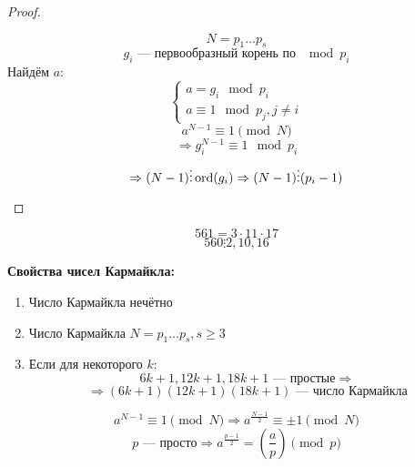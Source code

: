 \begin{proof}
\begin{itemize}
\begin{itemize}
\[                        N = p_1 \ldots p_s
                    \]
                    \[
                        g_i \text{ --- первообразный корень по $\mod p_i$}
                    \]
                    Найдём $a$:
                    \[
                    \begin{cases}
                    a = g_i \mod p_i \\
                    a \equiv 1 \mod p_j, j \neq i
                    \end{cases}
                    \]
                    \[
                    a^{N - 1} \equiv 1 \pmod N
                    \]
                    \[
                    \Rightarrow g_i ^{N - 1} \equiv 1 \mod p_i
                    \]
                    \[
                   \Rightarrow (N - 1) \vdots  \operatorname{ord}(g_i) \Rightarrow (N - 1) \vdots (p_i - 1)
                    \]
            \end{itemize}
    \end{itemize}
\end{proof}
\begin{example}
    \[
    561 = 3 \cdot 11 \cdot 17
    \]
    \[
    560 \vdots 2, 10, 16
    \]
\end{example}
\textbf{Свойства чисел Кармайкла:}
\begin{enumerate}
    \item Число Кармайкла нечётно
    \item Число Кармайкла $N = p_1 \ldots p_s, s \geq 3$
    \item Если для некоторого $k$:
        \[
        6k + 1, 12k + 1, 18k + 1 \text{ --- простые} \Rightarrow
        \]
        \[
        \Rightarrow (6k + 1)(12k + 1)(18k + 1) \text{ --- число Кармайкла}
        \]
\end{enumerate}
\[
a^{N - 1} \equiv 1 \pmod N \Rightarrow a^{\frac{N - 1}{2}} \equiv \pm 1 \pmod N
\]
\[
p \text{ --- просто} \Rightarrow a^{\frac{p - 1}{2}} = \left(\frac{a}{p}\right) \pmod p
\]
